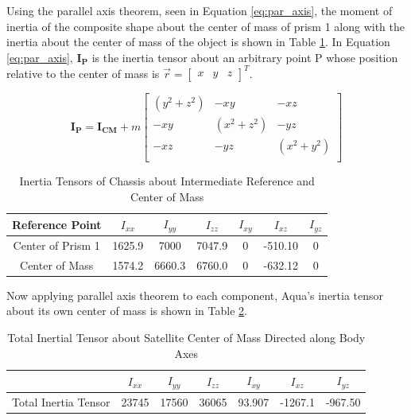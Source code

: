 Using the parallel axis theorem, seen in Equation \ref{eq:par_axis}, the moment of inertia of the composite shape about the center of mass of prism 1 along with the inertia about the center of mass of the object is shown in Table \ref{tab:chass_inertia}. In Equation \ref{eq:par_axis}, $\boldsymbol{I_P}$ is the inertia tensor about an arbitrary point P whose position relative to the center of mass is $\vec{r} = \begin{bmatrix} x & y & z \end{bmatrix}^T$.

\begin{equation} \label{eq:par_axis}
    \boldsymbol{I_{P}} = \boldsymbol{I_{CM}} + m \left[ \begin{array}{ccc}  (y^2 + z^2) & -  xy & -  xz \\ 
    -  xy &   (x^2 + z^2) & -  yz \\
-  xz & -  yz &  (x^2 + y^2) \\ \end{array} \right]
\end{equation}


\begin{table}[H]
    \centering
    \begin{tabular}{c|cccccc}
    Reference Point   & $I_{xx}$ & $I_{yy}$ & $I_{zz}$ & $I_{xy}$ & $I_{xz}$ & $I_{yz}$ \\ \hline
    Center of Prism 1 & 1625.9   & 7000     & 7047.9   & 0        & -510.10  & 0        \\
    Center of Mass    & 1574.2   & 6660.3   & 6760.0   & 0        & -632.12  & 0       
    \end{tabular}
    \caption{Inertia Tensors of Chassis about Intermediate Reference and Center of Mass}
    \label{tab:chass_inertia}
\end{table}

Now applying parallel axis theorem to each component, Aqua's inertia tensor about its own center of mass is shown in Table \ref{tab:total_ineretia}.

\begin{table}[H]
\centering
\begin{tabular}{c|cccccc}
                     & $I_{xx}$ & $I_{yy}$ & $I_{zz}$ & $I_{xy}$ & $I_{xz}$ & $I_{yz}$ \\ \hline
Total Inertia Tensor & 23745    & 17560    & 36065    & 93.907   & -1267.1  & -967.50 
\end{tabular}
\caption{Total Inertial Tensor about Satellite Center of Mass Directed along Body Axes}
\label{tab:total_ineretia}
\end{table}

